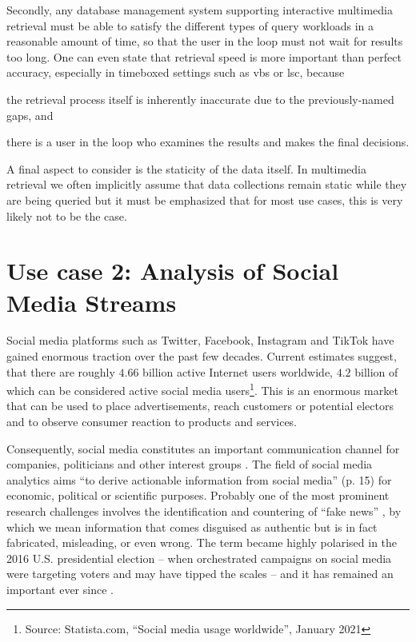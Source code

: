 Secondly, any database management system supporting interactive multimedia retrieval must be able to satisfy the different types of query workloads in a reasonable amount of time, so that the user in the loop must not wait for results too long. One can even state that retrieval speed is more important than perfect accuracy, especially in timeboxed settings such as \acrshort{vbs} or \acrshort{lsc}, because
\begin{enumerate*}[label=(\roman*)]
    \item the retrieval process itself is inherently inaccurate due to the previously-named gaps, and
    \item there is a user in the loop who examines the results and makes the final decisions.
\end{enumerate*}

A final aspect to consider is the staticity of the data itself. In multimedia retrieval we often implicitly assume that data collections remain static while they are being queried but it must be emphasized that for most use cases, this is very likely not to be the case. 

\section{Use case 2: Analysis of Social Media Streams}
\label{section:application_online_analysis}

Social media platforms such as Twitter, Facebook, Instagram and TikTok have gained enormous traction over the past few decades. Current estimates suggest, that there are roughly $4.66$ billion active Internet users worldwide, $4.2$ billion of which can be considered active social media users\footnote{Source: Statista.com, ``Social media usage worldwide'', January 2021}. This is an enormous market that can be used to place advertisements, reach customers or potential electors and to observe consumer reaction to products and services.

Consequently, social media constitutes an important communication channel for companies, politicians and other interest groups \cite{Barbera:2018New}. The field of social media analytics aims ``to derive actionable information from social media'' \cite{Zheng:2010Social} (p. 15) for economic, political or scientific purposes. Probably one of the most prominent research challenges involves the identification and countering of ``fake news'' \cite{Lazer:2018Science}, by which we mean information that comes disguised as authentic but is in fact fabricated, misleading, or even wrong. The term became highly polarised in the 2016 U.S. presidential election \cite{Quandt:2019Fake} -- when orchestrated campaigns on social media were targeting voters and may have tipped the scales -- and it has remained an important ever since \cite{Ferrara:2020Characterizing}.

